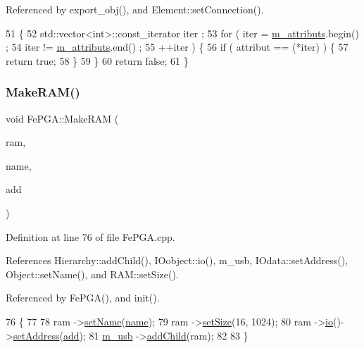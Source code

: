 Referenced by export\+\_\+obj(), and Element\+::set\+Connection().


\begin{DoxyCode}
51   \{
52     std::vector<int>::const\_iterator iter ;
53     \textcolor{keywordflow}{for} ( iter  = \hyperlink{classAttrib_ac4bd58a0cc6b38a3b711d609a3d3aacc}{m\_attributs}.begin() ;
54           iter != \hyperlink{classAttrib_ac4bd58a0cc6b38a3b711d609a3d3aacc}{m\_attributs}.end()   ;
55           ++iter ) \{
56       \textcolor{keywordflow}{if} ( attribut == (*iter) ) \{
57         \textcolor{keywordflow}{return} \textcolor{keyword}{true};
58       \}
59     \}
60     \textcolor{keywordflow}{return} \textcolor{keyword}{false};
61   \}
\end{DoxyCode}
\mbox{\label{classFePGA_ac3af50fbe7f8f7a8c6adbcb164cbbf47}} 
\subsubsection{\texorpdfstring{Make\+R\+A\+M()}{MakeRAM()}}
{\footnotesize\ttfamily void Fe\+P\+G\+A\+::\+Make\+R\+AM (\begin{DoxyParamCaption}\item[{\hyperlink{classRAM}{R\+AM} $\ast$}]{ram,  }\item[{std\+::string}]{name,  }\item[{unsigned int}]{add }\end{DoxyParamCaption})}



Definition at line 76 of file Fe\+P\+G\+A.\+cpp.



References Hierarchy\+::add\+Child(), I\+Oobject\+::io(), m\+\_\+usb, I\+Odata\+::set\+Address(), Object\+::set\+Name(), and R\+A\+M\+::set\+Size().



Referenced by Fe\+P\+G\+A(), and init().


\begin{DoxyCode}
76                                                              \{
77 
78   ram   ->\hyperlink{classObject_ae30fea75683c2d149b6b6d17c09ecd0c}{setName}(\hyperlink{classObject_a300f4c05dd468c7bb8b3c968868443c1}{name});
79   ram   ->\hyperlink{classRAM_adcf2ebb12f1a3e833ce7d5a33670c29d}{setSize}(16, 1024);        
80   ram   ->\hyperlink{classIOobject_af04fb94137c3d86849f478ac5afab5d1}{io}()->\hyperlink{classIOdata_af98cbfbc28346ebb9b64ca0203af1463}{setAddress}(\hyperlink{classAttrib_a235f773af19c900264a190b00a3b4ad7}{add});
81   \hyperlink{classFePGA_afb7947e600a66d914ee524acec3d8b1f}{m\_usb} ->\hyperlink{classHierarchy_ad677774ff38fcb257c04a3a10d471fac}{addChild}(ram);
82 
83 \}
\end{DoxyCode}
\mbox{\label{classFePGA_aa58fc0a09d8efa7abc2766bf5bb67327}} 
